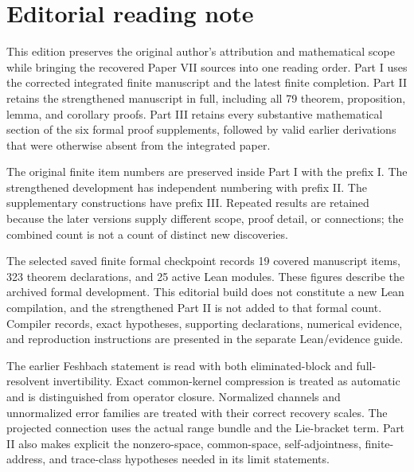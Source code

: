 \documentclass[11pt,letterpaper]{article}
\theoremstyle{definition}
\theoremstyle{remark}
\begin{document}
\KomorebiCover
{}

\hypersetup{pageanchor=false}

\hypersetup{pageanchor=true}
\section*{Editorial reading note}
This edition preserves the original author's attribution and mathematical scope while bringing the recovered Paper VII sources into one reading order. Part I uses the corrected integrated finite manuscript and the latest finite completion. Part II retains the strengthened manuscript in full, including all 79 theorem, proposition, lemma, and corollary proofs. Part III retains every substantive mathematical section of the six formal proof supplements, followed by valid earlier derivations that were otherwise absent from the integrated paper.

The original finite item numbers are preserved inside Part I with the prefix I. The strengthened development has independent numbering with prefix II. The supplementary constructions have prefix III. Repeated results are retained because the later versions supply different scope, proof detail, or connections; the combined count is not a count of distinct new discoveries.

The selected saved finite formal checkpoint records 19 covered manuscript items, 323 theorem declarations, and 25 active Lean modules. These figures describe the archived formal development. This editorial build does not constitute a new Lean compilation, and the strengthened Part II is not added to that formal count. Compiler records, exact hypotheses, supporting declarations, numerical evidence, and reproduction instructions are presented in the separate Lean/evidence guide.

The earlier Feshbach statement is read with both eliminated-block and full-resolvent invertibility. Exact common-kernel compression is treated as automatic and is distinguished from operator closure. Normalized channels and unnormalized error families are treated with their correct recovery scales. The projected connection uses the actual range bundle and the Lie-bracket term. Part II also makes explicit the nonzero-space, common-space, self-adjointness, finite-address, and trace-class hypotheses needed in its limit statements.
\end{document}
